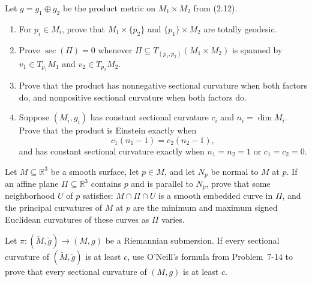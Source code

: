 \begin{exercise}
\label{prob:product-metric-submanifolds}

Let $g=g_1\oplus g_2$ be the product metric on $M_1\times M_2$ from (2.12).
\begin{enumerate}
\item[(a)] For $p_i\in M_i$, prove that
$M_1\times\{p_2\}$ and $\{p_1\}\times M_2$ are totally geodesic.
\item[(b)] Prove $\sec(\Pi)=0$ whenever
$\Pi\subseteq T_{(p_1,p_2)}(M_1\times M_2)$ is spanned by
$v_1\in T_{p_1}M_1$ and $v_2\in T_{p_2}M_2$.
\item[(c)] Prove that the product has nonnegative sectional curvature when
both factors do, and nonpositive sectional curvature when both factors do.
\item[(d)] Suppose $(M_i,g_i)$ has constant sectional curvature $c_i$ and
$n_i=\dim M_i$. Prove that the product is Einstein exactly when
\[
c_1(n_1-1)=c_2(n_2-1),
\]
and has constant sectional curvature exactly when
$n_1=n_2=1$ or $c_1=c_2=0$.
\end{enumerate}
\end{exercise}

\begin{exercise}
\label{prob:surface-affine-plane-curvature}

Let $M\subseteq\mathbb R^3$ be a smooth surface, let $p\in M$, and let
$N_p$ be normal to $M$ at $p$. If an affine plane
$\Pi\subseteq\mathbb R^3$ contains $p$ and is parallel to $N_p$, prove that
some neighborhood $U$ of $p$ satisfies:
$M\cap\Pi\cap U$ is a smooth embedded curve in $\Pi$, and the principal
curvatures of $M$ at $p$ are the minimum and maximum signed Euclidean
curvatures of these curves as $\Pi$ varies.
\end{exercise}

\begin{exercise}
\label{prob:riemannian-immersion-bounded-sectional-curvatures}

Let $\pi:(\widetilde M,\widetilde g)\to(M,g)$ be a Riemannian submersion.
If every sectional curvature of $(\widetilde M,\widetilde g)$ is at least
$c$, use O'Neill's formula from Problem~7-14 to prove that every sectional
curvature of $(M,g)$ is at least $c$.
\end{exercise}

